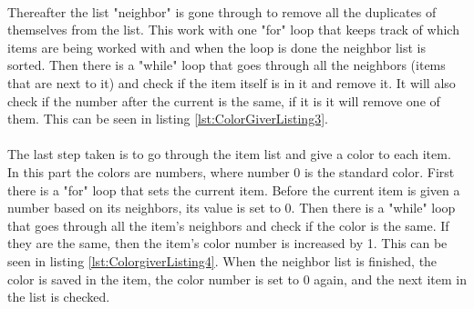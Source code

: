 \\
Thereafter the list "neighbor" is gone through to remove all the duplicates of themselves from the list. This work with one "for" loop that keeps track of which items are being worked with and when the loop is done the neighbor list is sorted. Then there is a "while" loop that goes through all the neighbors (items that are next to it) and check if the item itself is in it and remove it. It will also check if the number after the current is the same, if it is it will remove one of them. This can be seen in listing \ref{lst:ColorGiverListing3}.\\
\\
The last step taken is to go through the item list and give a color to each item. In this part the colors are numbers, where number 0 is the standard color. First there is a "for" loop that sets the current item. Before the current item is given a number based on its neighbors, its value is set to 0. Then there is a "while" loop that goes through all the item's neighbors and check if the color is the same. If they are the same, then the item's color number is increased by 1. This can be seen in listing \ref{lst:ColorgiverListing4}. When the neighbor list is finished, the color is saved in the item, the color number is set to 0 again, and the next item in the list is checked.
